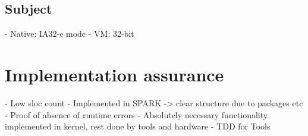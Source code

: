 \subsection{Subject}
- Native: IA32-e mode
- VM: 32-bit

\section{Implementation assurance}
- Low sloc count
- Implemented in SPARK -> clear structure due to packages etc
- Proof of absence of runtime errors
- Absolutely necessary functionality implemented in kernel, rest done by tools
  and hardware
- TDD for Tools
